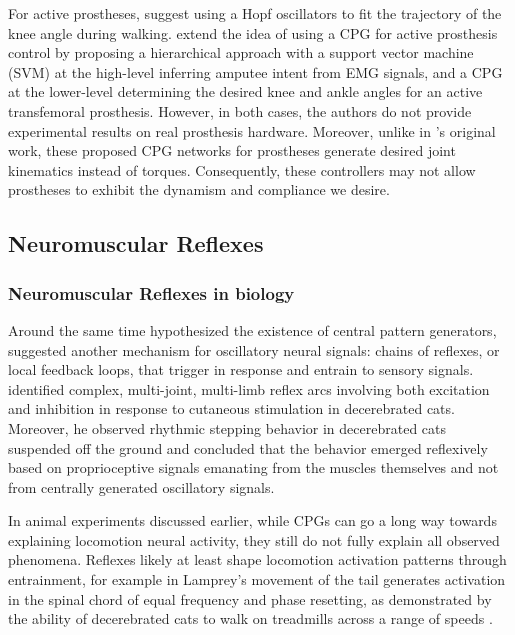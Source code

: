 For active prostheses, \citet{geng2012design} suggest using a Hopf oscillators
to fit the trajectory of the knee angle during walking. \citet{guo2010study}
extend the idea of using a CPG for active prosthesis control by proposing a
hierarchical approach with a support vector machine (SVM) at the high-level
inferring amputee intent from EMG signals, and a CPG at the lower-level
determining the desired knee and ankle angles for an active transfemoral
prosthesis. However, in both cases, the authors do not provide experimental
results on real prosthesis hardware. Moreover, unlike in
\citeauthor{taga1991self}'s original work, these proposed CPG networks for
prostheses generate desired joint kinematics instead of torques. Consequently,
these controllers may not allow prostheses to exhibit the dynamism and
compliance we desire.

\subsection{Neuromuscular Reflexes}
\subsubsection{Neuromuscular Reflexes in biology}
Around the same time \citeauthor{brown1911intrinsic} hypothesized the existence
of central pattern generators, \citet{sherrington1910integrative,
sherrington1910flexion} suggested another mechanism for oscillatory neural
signals: chains of reflexes, or local feedback loops, that trigger in response
and entrain to sensory signals. \citeauthor{sherrington1910integrative}
identified complex, multi-joint, multi-limb reflex arcs involving both
excitation and inhibition in response to cutaneous stimulation in decerebrated
cats. Moreover, he observed rhythmic stepping behavior in decerebrated cats
suspended off the ground and concluded that the behavior emerged reflexively
based on proprioceptive signals emanating from the muscles themselves and not
from centrally generated oscillatory signals.

In animal experiments discussed earlier, while CPGs can go a long way towards
explaining locomotion neural activity, they still do not fully explain all
observed phenomena. Reflexes likely at least shape locomotion activation
patterns through entrainment, for example in Lamprey's movement of the tail
generates activation in the spinal chord of equal frequency
\citep{mcclellan1993mechanosensory} and phase resetting, as demonstrated by the
ability of decerebrated cats to walk on treadmills across a range of speeds
\citep{rossignol2000locomotion}.

